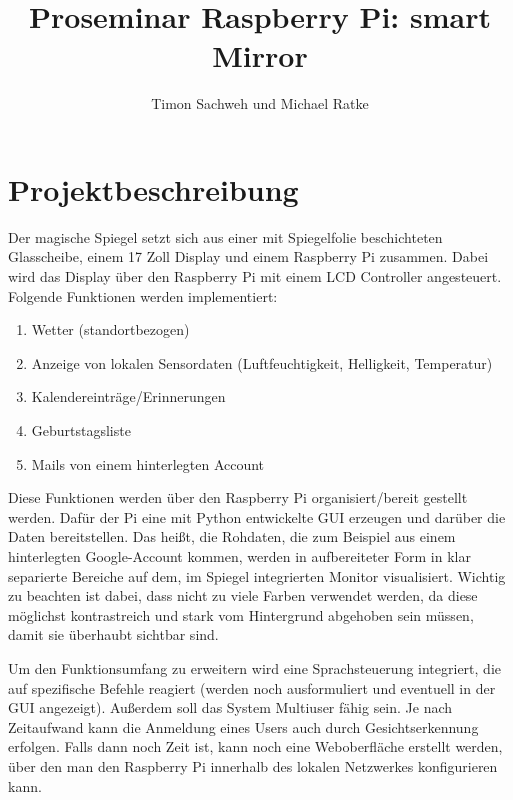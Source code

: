 \documentclass[11pt,a4paper]{article}
\author{Timon Sachweh und Michael Ratke}
\title{Proseminar Raspberry Pi: smart Mirror}
\begin{document}
\maketitle

\newpage
\tableofcontents

\newpage
\section{Projektbeschreibung}
Der magische Spiegel setzt sich aus einer mit Spiegelfolie beschichteten Glasscheibe, einem 17 Zoll Display und einem Raspberry Pi zusammen. Dabei wird das Display über den Raspberry Pi mit einem LCD Controller angesteuert.
Folgende Funktionen werden implementiert:
\begin{enumerate}
	\item Wetter (standortbezogen)
	\item Anzeige von lokalen Sensordaten (Luftfeuchtigkeit, Helligkeit, Temperatur)
	\item Kalendereinträge/Erinnerungen
	\item Geburtstagsliste
	\item Mails von einem hinterlegten Account
\end{enumerate}
Diese Funktionen werden über den Raspberry Pi organisiert/bereit gestellt werden. Dafür der Pi eine mit Python entwickelte GUI erzeugen und darüber die Daten bereitstellen. Das heißt, die Rohdaten, die zum Beispiel aus einem hinterlegten Google-Account kommen, werden in aufbereiteter Form in klar separierte Bereiche auf dem, im Spiegel integrierten Monitor visualisiert. Wichtig zu beachten ist dabei, dass nicht zu viele Farben verwendet werden, da diese möglichst kontrastreich und stark vom Hintergrund abgehoben sein müssen, damit sie überhaubt sichtbar sind.

Um den Funktionsumfang zu erweitern wird eine Sprachsteuerung integriert, die auf spezifische Befehle reagiert (werden noch ausformuliert und eventuell in der GUI angezeigt). Außerdem soll das System Multiuser fähig sein. Je nach Zeitaufwand kann die Anmeldung eines Users auch durch Gesichtserkennung erfolgen.
Falls dann noch Zeit ist, kann noch eine Weboberfläche erstellt werden, über den man den Raspberry Pi innerhalb des lokalen Netzwerkes konfigurieren kann.
\end{document}
